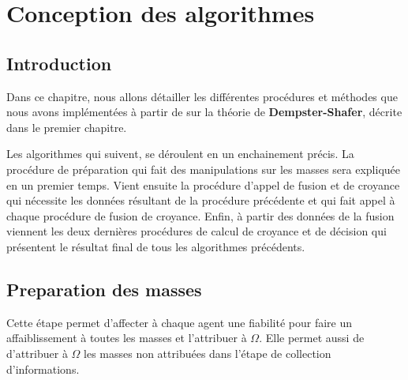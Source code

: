 \chapter{Conception des algorithmes}

{}
\section*{Introduction}

Dans ce chapitre, nous allons détailler les différentes procédures et méthodes que nous avons implémentées à partir de  sur la théorie de\textbf{ Dempster-Shafer}, décrite dans le premier chapitre.

Les algorithmes qui suivent, se déroulent en un enchainement précis.
La procédure de préparation qui fait des manipulations sur les masses sera expliquée en un premier temps. Vient ensuite la procédure d'appel de fusion et de croyance qui nécessite les données résultant de la procédure précédente et qui fait appel à chaque procédure de fusion de croyance. Enfin, à partir des données de la fusion viennent les deux dernières procédures de calcul de croyance et de décision qui présentent le résultat final de tous les algorithmes précédents.

\DontPrintSemicolon
\section{Preparation des masses}
Cette étape permet d'affecter à chaque agent une fiabilité pour faire un affaiblissement à toutes les masses et l'attribuer à $\Omega$. Elle permet aussi de d'attribuer à $\Omega$ les masses non attribuées dans l'étape de collection d'informations.   

